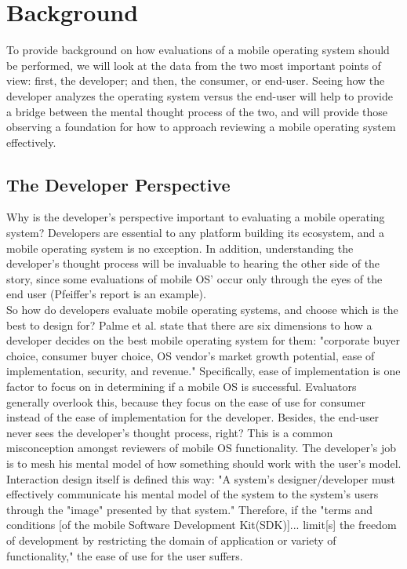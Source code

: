 \documentclass[11pt]{article}
\begin{document}
\section{Background}
\label{background}
To provide background on how evaluations of a mobile operating system should be performed, we will look at the data from the two most important points of view: first, the developer; and then, the consumer, or end-user. Seeing how the developer analyzes the operating system versus the end-user will help to provide a bridge between the mental thought process of the two, and will provide those observing a foundation for how to approach reviewing a mobile operating system effectively.
\subsection{The Developer Perspective}
Why is the developer's perspective important to evaluating a mobile operating system? Developers are essential to any platform building its ecosystem, and a mobile operating system is no exception. In addition, understanding the developer's thought process will be invaluable to hearing the other side of the story, since some evaluations of mobile OS' occur only through the eyes of the end user (Pfeiffer's report is an example). \\
\indent So how do developers evaluate mobile operating systems, and choose which is the best to design for? Palme et al. state that there are six dimensions to how a developer decides on the best mobile operating system for them: "corporate buyer choice, consumer buyer choice, OS vendor's market growth potential, ease of implementation, security, and revenue." \cite{Palme} Specifically, ease of implementation is one factor to focus on in determining if a mobile OS is successful. Evaluators generally overlook this, because they focus on the ease of use for consumer instead of the ease of implementation for the developer. Besides, the end-user never sees the developer's thought process, right? This is a common misconception amongst reviewers of mobile OS functionality. The developer's job is to mesh his mental model of how something should work with the user's model. Interaction design itself is defined this way: "A system's designer/developer must effectively communicate his mental model of the system to the system's users through the "image" presented by that system." Therefore, if the "terms and 
conditions [of the mobile Software Development Kit(SDK)]... limit[s] the freedom of development by restricting the domain of application or variety of functionality," the ease of use for the user suffers. \cite{Palme}
\end{document}
